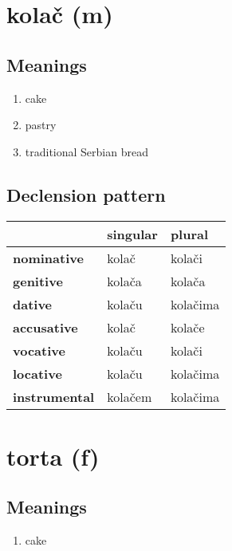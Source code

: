 \filbreak
\section{kolač (m)}
\subsection*{Meanings}
\begin{enumerate}
\item cake
\item pastry
\item traditional Serbian bread
\end{enumerate}
\subsection*{Declension pattern}
\begin{tabularx}{\linewidth}{Xll}
\toprule
{} & singular &    plural \\
\midrule
\textbf{nominative  } &    kolač &    kolači \\
\textbf{genitive    } &   kolača &    kolača \\
\textbf{dative      } &   kolaču &  kolačima \\
\textbf{accusative  } &    kolač &    kolače \\
\textbf{vocative    } &   kolaču &    kolači \\
\textbf{locative    } &   kolaču &  kolačima \\
\textbf{instrumental} &  kolačem &  kolačima \\
\bottomrule
\end{tabularx}

\filbreak
\section{torta (f)}
\subsection*{Meanings}
\begin{enumerate}
\item cake
\end{enumerate}
